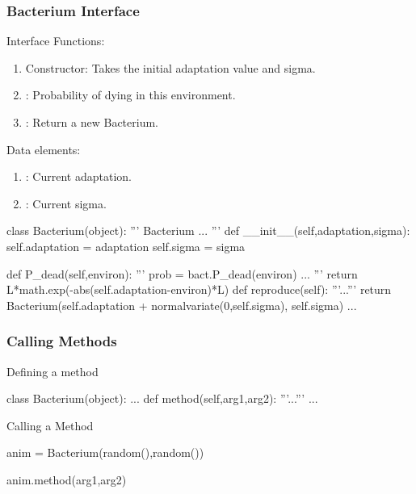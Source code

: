 \begin{frame}[fragile] 
\frametitle{Bacterium Interface}

\begin{block}{Interface}
Functions:
\begin{enumerate}
\item Constructor: Takes the initial adaptation value and sigma.
\item {}: Probability of dying in this environment.
\item {}: Return a new Bacterium.
\end{enumerate}
Data elements:
\begin{enumerate}
\item {}: Current adaptation.
\item {}: Current sigma.
\end{enumerate}
\end{block}
\end{frame}


\begin{frame}[fragile]
\begin{python}
class Bacterium(object):
    '''
    Bacterium
    ...
    '''
    def __init__(self,adaptation,sigma):
        self.adaptation = adaptation
        self.sigma = sigma
    
    def P_dead(self,environ):
        '''
        prob = bact.P_dead(environ)
        ...
        '''
        return L*math.exp(-abs(self.adaptation-environ)*L)
    def reproduce(self):
        '''...'''
        return Bacterium(self.adaptation +
                             normalvariate(0,self.sigma),
                             self.sigma)
    ...
\end{python}
\end{frame}

\begin{frame}[fragile]
\frametitle{Calling Methods}

\begin{block}{Defining a method}
\begin{python}
class Bacterium(object):
    ...
    def method(self,arg1,arg2):
        '''...'''
        ...
\end{python}
\end{block}

\begin{block}{Calling a Method}
\begin{python}
anim = Bacterium(random(),random())

anim.method(arg1,arg2)
\end{python}
\end{block}
\end{frame}

